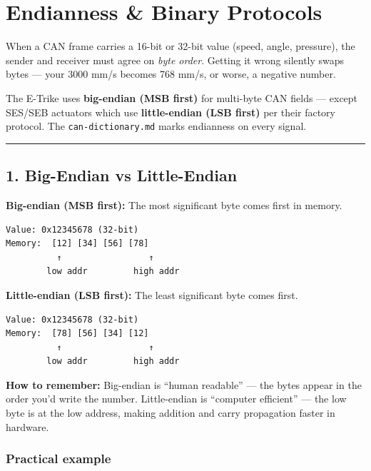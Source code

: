 \documentclass[12pt,a4paper,oneside]{report}
\begin{document}
\chapter{Endianness \& Binary Protocols}\label{endianness-binary-protocols}

When a CAN frame carries a 16-bit or 32-bit value (speed, angle, pressure), the
sender and receiver must agree on \emph{byte order}. Getting it wrong silently
swaps bytes --- your 3000 mm/s becomes 768 mm/s, or worse, a negative number.

The E-Trike uses \textbf{big-endian (MSB first)} for multi-byte CAN fields ---
except SES/SEB actuators which use \textbf{little-endian (LSB first)} per their
factory protocol. The \texttt{can-dictionary.md} marks endianness on every
signal.

\begin{center}\rule{0.5\linewidth}{0.5pt}\end{center}

\section{1. Big-Endian vs Little-Endian}\label{big-endian-vs-little-endian}

\textbf{Big-endian (MSB first):} The most significant byte comes first in
memory.

\begin{verbatim}
Value: 0x12345678 (32-bit)
Memory:  [12] [34] [56] [78]
          ↑                 ↑
        low addr         high addr
\end{verbatim}

\textbf{Little-endian (LSB first):} The least significant byte comes first.

\begin{verbatim}
Value: 0x12345678 (32-bit)
Memory:  [78] [56] [34] [12]
          ↑                 ↑
        low addr         high addr
\end{verbatim}

\textbf{How to remember:} Big-endian is ``human readable'' --- the bytes appear
in the order you'd write the number. Little-endian is ``computer efficient'' ---
the low byte is at the low address, making addition and carry propagation faster
in hardware.

\subsection{Practical example}\label{practical-example}
\end{document}
